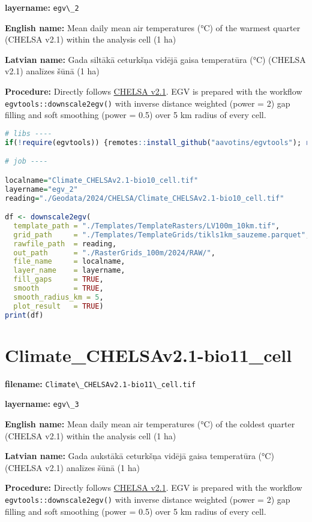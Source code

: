 \documentclass[
]{book}
\newcommand{\passthrough}[1]{#1}
\begin{document}
\textbf{layername:} \passthrough{\lstinline!egv\_2!}

\textbf{English name:} Mean daily mean air temperatures (°C) of the warmest quarter (CHELSA v2.1) within the analysis cell (1 ha)

\textbf{Latvian name:} Gada siltākā ceturkšņa vidējā gaisa temperatūra (°C) (CHELSA v2.1) analīzes šūnā (1 ha)

\textbf{Procedure:} Directly follows \hyperref[Ch04.11]{CHELSA v2.1}. EGV is prepared with the
workflow \passthrough{\lstinline!egvtools::downscale2egv()!} with inverse distance weighted (power = 2)
gap filling and soft smoothing (power = 0.5) over 5 km radius of every cell.

\begin{lstlisting}[language=R]
# libs ----
if(!require(egvtools)) {remotes::install_github("aavotins/egvtools"); require(egvtools)}

# job ----

localname="Climate_CHELSAv2.1-bio10_cell.tif"
layername="egv_2"
reading="./Geodata/2024/CHELSA/Climate_CHELSAv2.1-bio10_cell.tif"

df <- downscale2egv(
  template_path = "./Templates/TemplateRasters/LV100m_10km.tif",
  grid_path     = "./Templates/TemplateGrids/tikls1km_sauzeme.parquet",
  rawfile_path  = reading,
  out_path      = "./RasterGrids_100m/2024/RAW/",
  file_name     = localname,
  layer_name    = layername,
  fill_gaps     = TRUE,
  smooth        = TRUE,
  smooth_radius_km = 5,
  plot_result   = TRUE)
print(df)
\end{lstlisting}

\section{Climate\_CHELSAv2.1-bio11\_cell}\label{ch06.003}

\textbf{filename:} \passthrough{\lstinline!Climate\_CHELSAv2.1-bio11\_cell.tif!}

\textbf{layername:} \passthrough{\lstinline!egv\_3!}

\textbf{English name:} Mean daily mean air temperatures (°C) of the coldest quarter (CHELSA v2.1) within the analysis cell (1 ha)

\textbf{Latvian name:} Gada aukstākā ceturkšņa vidējā gaisa temperatūra (°C) (CHELSA v2.1) analīzes šūnā (1 ha)

\textbf{Procedure:} Directly follows \hyperref[Ch04.11]{CHELSA v2.1}. EGV is prepared with the
workflow \passthrough{\lstinline!egvtools::downscale2egv()!} with inverse distance weighted (power = 2)
gap filling and soft smoothing (power = 0.5) over 5 km radius of every cell.
\end{document}
